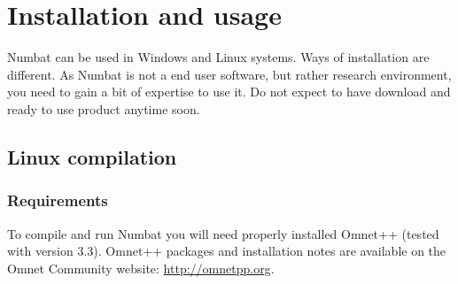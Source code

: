\section{Installation and usage}

Numbat can be used in Windows and Linux systems. Ways of installation
are different. As Numbat is not a end user software, but rather
research environment, you need to gain a bit of expertise to use
it. Do not expect to have download and ready to use product anytime
soon.

\subsection{Linux compilation}

\subsubsection{Requirements}
To compile and run Numbat you will need properly installed Omnet++
(tested with version 3.3). Omnet++ packages and installation notes are
available on the Omnet Community website:
\href{http://omnetpp.org}{http://omnetpp.org}.

